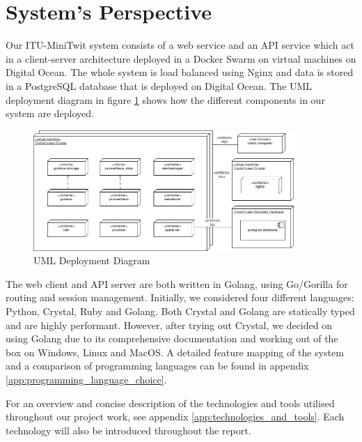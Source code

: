 \section{System's Perspective}



Our ITU-MiniTwit system consists of a web service and an API service which act in a client-server architecture deployed in a Docker Swarm on virtual machines on Digital Ocean. 
The whole system is load balanced using Nginx and data is stored in a PostgreSQL database that is deployed on Digital Ocean. 
The UML deployment diagram in figure \ref{fig:deployment} shows how the different components in our system are deployed.

\begin{figure}[h]
    \centering
    \includegraphics[width=0.9\textwidth]{images/deployment.png}
    \caption{UML Deployment Diagram}
    \label{fig:deployment}
\end{figure}

The web client and API server are both written in Golang, using Go/Gorilla for routing and session management. 
Initially, we considered four different languages: Python, Crystal, Ruby and Golang. 
Both Crystal and Golang are statically typed and are highly performant.
However, after trying out Crystal, we decided on using Golang due to its comprehensive documentation and working out of the box on Windows, Linux and MacOS.
A detailed feature mapping of the system and a comparison of programming languages can be found in appendix \ref{app:programming_language_choice}. 

For an overview and concise description of the technologies and tools utilised throughout our project work, see appendix \ref{app:technologies_and_tools}. Each technology will also be introduced throughout the report.

